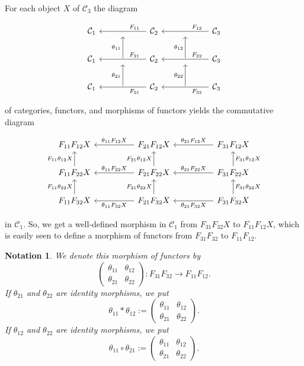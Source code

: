 \documentclass[12pt]{article}%
\newtheorem{nota}[thm]{Notation}
\theoremstyle{remark}
\theoremstyle{definition}
\newcommand{\nn}{\noindent}
\newcommand{\C}{\mathcal C}
\begin{document}
For each object $X$ of $\C_3$ the diagram 

$$
\begin{tikzcd}
%
\C_1&{}&\C_2\ar{ll}{}[near start,swap]{F_{11}}&{}&\C_3\ar{ll}{}[near start,swap]{F_{12}}\\ 
%
\C_1&\ar{u}{\theta_{11}}&\C_2\ar{ll}{}[near start,swap]{F_{21}}&\ar{u}{\theta_{12}}&\C_3\ar{ll}{}[near start,swap]{F_{22}}\\ 
%
\C_1&\ar{u}{\theta_{21}}&\C_2\ar{ll}{}[near start]{F_{31}}&\ar{u}{\theta_{22}}&\C_3\ar{ll}{}[near start]{F_{32}}
%
\end{tikzcd}
$$ 

\nn of categories, functors, and morphisms of functors yields the commutative diagram 

$$
\begin{tikzcd}
%
F_{11}F_{12}X&&F_{21}F_{12}X\ar{ll}[swap]{\theta_{11}F_{12}X}&&F_{31}F_{12}X\ar{ll}[swap]{\theta_{21}F_{12}X}\\ 
%
F_{11}F_{22}X\ar{u}{F_{11}\theta_{12}X}&&F_{21}F_{22}X\ar{ll}[swap]{\theta_{11}F_{22}X}\ar{u}{F_{21}\theta_{12}X}&&F_{31}F_{22}X\ar{ll}[swap]{\theta_{21}F_{22}X}\ar{u}[swap]{F_{31}\theta_{12}X}\\ 
%
F_{11}F_{32}X\ar{u}{F_{11}\theta_{22}X}&&F_{21}F_{32}X\ar{ll}{\theta_{11}F_{32}X}\ar{u}{F_{21}\theta_{22}X}&&F_{31}F_{32}X\ar{ll}{\theta_{21}F_{32}X}\ar{u}[swap]{F_{31}\theta_{22}X}
%
\end{tikzcd}
$$ 

\nn in $\C_1$. So, we get a well-defined morphism in $\C_1$ from $F_{31}F_{32}X$ to $F_{11}F_{12}X$, which is easily seen to define a morphism of functors from $F_{31}F_{32}$ to $F_{11}F_{12}$. 

\begin{nota}\label{nhove}
We denote this morphism of functors by
$$
\begin{pmatrix}
\theta_{11}&\theta_{12}\\ 
\theta_{21}&\theta_{22}
\end{pmatrix}:F_{31}F_{32}\to F_{11}F_{12}.
$$ 
If $\theta_{21}$ and $\theta_{22}$ are identity morphisms, we put 
$$
\theta_{11}*\theta_{12}:=
\begin{pmatrix}
\theta_{11}&\theta_{12}\\ 
\theta_{21}&\theta_{22}
\end{pmatrix}.
$$ 
If $\theta_{12}$ and $\theta_{22}$ are identity morphisms, we put 
$$
\theta_{11}\circ\theta_{21}:=
\begin{pmatrix}
\theta_{11}&\theta_{12}\\ 
\theta_{21}&\theta_{22}
\end{pmatrix}.
$$ 
\end{nota}
\end{document}

